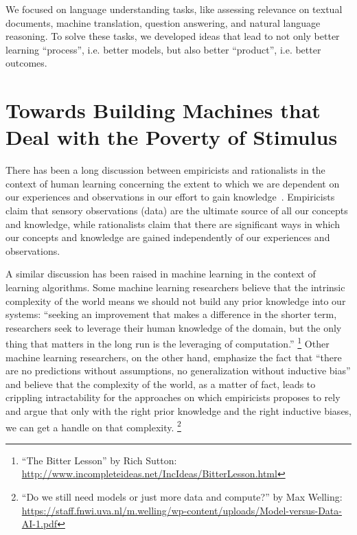 We focused on language understanding tasks, like assessing relevance on textual documents, machine translation, question answering, and natural language reasoning. To solve these tasks, we developed ideas that lead to not only better learning ``process'', i.e. better models, but also better ``product'', i.e. better outcomes. 







\section{Towards Building Machines that Deal with the Poverty of Stimulus}

There has been a long discussion between empiricists and rationalists in the context of human learning concerning the extent to which we are dependent on our experiences and observations in our effort to gain knowledge~\citep{markie2004rationalism}.  
%
Empiricists claim that sensory observations (data) are the ultimate source of all our concepts and knowledge, while rationalists claim that there are significant ways in which our concepts and knowledge are gained independently of our experiences and observations. 

A similar discussion has been raised in machine learning in the context of learning algorithms.
%
Some machine learning researchers believe that the intrinsic complexity of the world means we should not build any prior knowledge into our systems: ``seeking an improvement that makes a difference in the shorter term, researchers seek to leverage their human knowledge of the domain, but the only thing that matters in the long run is the leveraging of computation.''%
\footnote{``The Bitter Lesson'' by Rich Sutton: \url{http://www.incompleteideas.net/IncIdeas/BitterLesson.html}}
%
Other machine learning researchers, on the other hand, emphasize the fact that ``there are no predictions without assumptions, no generalization without inductive bias'' and believe that the complexity of the world, as a matter of fact, leads to crippling intractability for the approaches on which empiricists proposes to rely and argue that only with the right prior knowledge and the right inductive biases, we can get a handle on that complexity.
\footnote{``Do we still need models or just more data and compute?'' by Max Welling: \url{https://staff.fnwi.uva.nl/m.welling/wp-content/uploads/Model-versus-Data-AI-1.pdf}}

